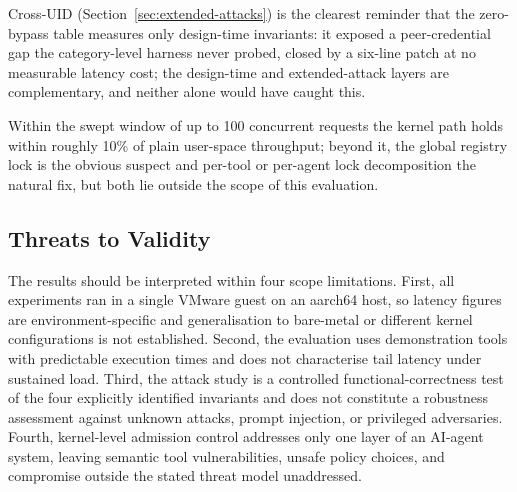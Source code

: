 Cross-UID (Section~\ref{sec:extended-attacks}) is the clearest reminder that the zero-bypass table measures only design-time invariants: it exposed a peer-credential gap the category-level harness never probed, closed by a six-line patch at no measurable latency cost; the design-time and extended-attack layers are complementary, and neither alone would have caught this.

Within the swept window of up to 100 concurrent requests the kernel path holds within roughly 10\% of plain user-space throughput; beyond it, the global registry lock is the obvious suspect and per-tool or per-agent lock decomposition the natural fix, but both lie outside the scope of this evaluation.



\subsection{Threats to Validity}

The results should be interpreted within four scope limitations.
First, all experiments ran in a single VMware guest on an aarch64 host, so latency figures are environment-specific and generalisation to bare-metal or different kernel configurations is not established.
Second, the evaluation uses demonstration tools with predictable execution times and does not characterise tail latency under sustained load.
Third, the attack study is a controlled functional-correctness test of the four explicitly identified invariants and does not constitute a robustness assessment against unknown attacks, prompt injection, or privileged adversaries.
Fourth, kernel-level admission control addresses only one layer of an AI-agent system, leaving semantic tool vulnerabilities, unsafe policy choices, and compromise outside the stated threat model unaddressed.
